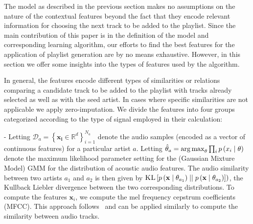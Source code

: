 The model as described in the previous section makes no assumptions on the nature of the contextual features beyond the fact that they encode relevant information for choosing the next track to be added to the playlist.  
Since the main contribution of this paper is in the definition of the model and corresponding learning algorithm, our efforts to find the best features for the application of playlist generation are by no means exhaustive. 
However, in this section we offer some insights into the types of features used by the algorithm.


In general, the features encode different types of similarities or relations  comparing a candidate track to be added to the playlist with tracks already selected as well as with the seed artist. In cases where specific similarities are not applicable we apply zero-imputation.
We divide the features into four groups categorized according to the type of signal employed in their calculation:

 -
Letting $\mathcal{D}_a=\left\{\mathbf{x_i} \in \mathbb{R}^d\right\}_{i=1}^{N_a}$ denote the audio samples (encoded as a vector of continuous features) for a particular artist $a$. Letting $\hat{\theta}_a=\argmax_{\theta} \prod_i p\left(x_i\mid\theta\right)$ denote the maximum likelihood parameter setting for the (Gaussian Mixture Model) GMM  for the distribution of acoustic audio features. The audio similarity between two artists $a_1$ and $a_2$ is then given by $\textsc{KL}\left[ p\left(\mathbf{x}\mid\theta_{a_1}\right) \mid \mid p\left(\mathbf{x}\mid\theta_{a_2}\right)\right
])$, the Kullback Liebler divergence between the two corresponding distributions. To compute the features $\mathbf{x}_i$, we compute the mel frequency cepstrum coefficients (MFCC). This approach follows~\cite{ReynoldsQD00} and can be applied similarly to compute the similarity between audio tracks.

